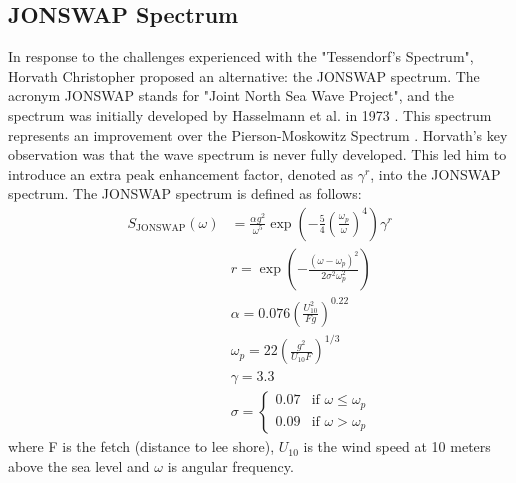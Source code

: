 \subsection{JONSWAP Spectrum}
In response to the challenges experienced with the "Tessendorf's Spectrum", Horvath Christopher \cite{horvath2015} proposed an alternative: the JONSWAP spectrum. The acronym JONSWAP stands for "Joint North Sea Wave Project", and the spectrum was initially developed by Hasselmann et al. in 1973 \cite{hasselmann1973}. This spectrum represents an improvement over the Pierson-Moskowitz Spectrum \cite{pierson1964}. Horvath's key observation was that the wave spectrum is never fully developed. This led him to introduce an extra peak enhancement factor, denoted as $\gamma^r$, into the JONSWAP spectrum.
The JONSWAP spectrum is defined as follows:
\begin{equation}
    \begin{aligned}
        S_{\text{JONSWAP}}(\omega) &= \frac{\alpha g^{2}}{\omega^{5}} \exp \left(-\frac{5}{4} \left(\frac{\omega_{p}}{\omega}\right)^{4}\right) \gamma^{r} \\
        &r = \exp\left(-\frac{(\omega - \omega_p)^{2}}{2 \sigma^{2}\omega^{2}_p}\right) \\
        &\alpha = 0.076 \left( \frac{U^{2}_{10}}{Fg} \right)^{0.22} \\
        &\omega_p = 22 \left( \frac{g^{2}}{U_{10}F} \right)^{1/3} \\
        &\gamma = 3.3 \\
        &\sigma = 
        \begin{cases} 
        0.07 & \text{if } \omega \leq \omega_p \\
        0.09 & \text{if } \omega > \omega_p
        \end{cases}
    \end{aligned}
\end{equation}
where F is the fetch (distance to lee shore), $U_{10}$ is the wind speed at 10 meters above the sea level and $\omega$ is angular frequency.

